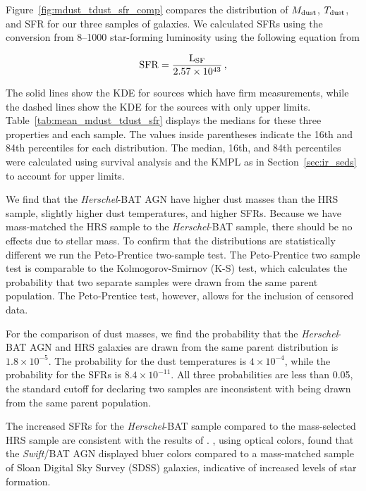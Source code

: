 \documentclass[fleqn, usenatbib]{mnras}
\newcommand{\herschel}{\emph{Herschel}}
\newcommand{\swift}{\textit{Swift}}
\newcommand{\mdust}{$M_{\rm dust}$}
\newcommand{\tdust}{$T_{\rm dust}$}
\begin{document}
Figure~\ref{fig:mdust_tdust_sfr_comp} compares the distribution of \mdust, \tdust, and SFR for our three samples of galaxies. We calculated SFRs using the conversion from 8--1000 \micron{} star-forming luminosity using the following equation from \citet{Murphy:2011rt}

\begin{equation}\label{eq:sfr_ir}
\rm{SFR} = \frac{L_{\rm SF}}{2.57\times10^{43}}\,,
\end{equation}

\noindent The solid lines show the KDE for sources which have firm measurements, while the dashed lines show the KDE for the sources with only upper limits. Table~\ref{tab:mean_mdust_tdust_sfr} displays the medians for these three properties and each sample. The values inside parentheses indicate the 16th and 84th percentiles for each distribution. The median, 16th, and 84th percentiles were calculated using survival analysis and the KMPL as in Section~\ref{sec:ir_seds} to account for upper limits.


We find that the \herschel-BAT AGN have higher dust masses than the HRS sample, slightly higher dust temperatures, and higher SFRs. Because we have mass-matched the HRS sample to the \herschel-BAT sample, there should be no effects due to stellar mass. To confirm that the distributions are statistically different we run the Peto-Prentice two-sample test. The Peto-Prentice two sample test is comparable to the Kolmogorov-Smirnov (K-S) test, which calculates the probability that two separate samples were drawn from the same parent population. The Peto-Prentice test, however, allows for the inclusion of censored data. 

For the comparison of dust masses, we find the probability that the \herschel-BAT AGN and HRS galaxies are drawn from the same parent distribution is $1.8\times10^{-5}$. The probability for the dust temperatures is $4\times10^{-4}$, while the probability for the SFRs is $8.4\times10^{-11}$. All three probabilities are less than 0.05, the standard cutoff for declaring two samples are inconsistent with being drawn from the same parent population. 

The increased SFRs for the \herschel-BAT sample compared to the mass-selected HRS sample are consistent with the results of \citet{Koss:2011vn}. \citet{Koss:2011vn}, using optical colors, found that the \swift/BAT AGN displayed bluer colors compared to a mass-matched sample of Sloan Digital Sky Survey (SDSS) galaxies, indicative of increased levels of star formation. %
\end{document}
